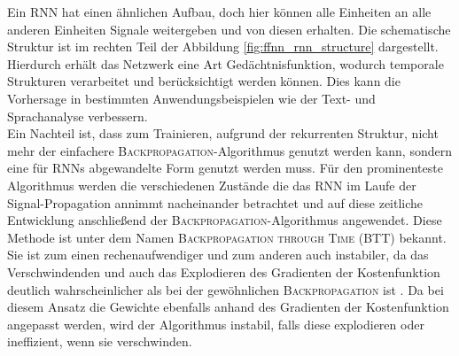 Ein \textsc{RNN} hat einen ähnlichen Aufbau, doch hier können alle Einheiten an alle anderen Einheiten Signale weitergeben und von diesen erhalten. Die schematische Struktur ist im rechten Teil der Abbildung \ref{fig:ffnn_rnn_structure} dargestellt. Hierdurch erhält das Netzwerk eine Art Gedächtnisfunktion, wodurch temporale Strukturen verarbeitet und berücksichtigt werden können. Dies kann die Vorhersage in bestimmten Anwendungsbeispielen wie der Text- und Sprachanalyse verbessern.\\
Ein Nachteil ist, dass zum Trainieren, aufgrund der rekurrenten Struktur, nicht mehr der einfachere \textsc{Backpropagation}-Algorithmus genutzt werden kann, sondern eine für \textsc{RNN}s abgewandelte Form genutzt werden muss. Für den prominenteste Algorithmus werden die verschiedenen Zustände die das \textsc{RNN} im Laufe der Signal-Propagation annimmt nacheinander betrachtet und auf diese zeitliche Entwicklung anschließend der \textsc{Backpropagation}-Algorithmus angewendet. Diese Methode ist unter dem Namen \textsc{Backpropagation through Time} (BTT) bekannt. Sie ist zum einen rechenaufwendiger und zum anderen auch instabiler, da das Verschwindenden und auch das Explodieren des Gradienten der Kostenfunktion deutlich wahrscheinlicher als bei der gewöhnlichen \textsc{Backpropagation} ist \citep{pascanu, jeagerTut2002}. Da bei diesem Ansatz die Gewichte ebenfalls anhand des Gradienten der Kostenfunktion angepasst werden, wird der Algorithmus instabil, falls diese explodieren oder ineffizient, wenn sie verschwinden.

